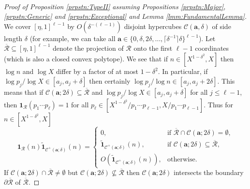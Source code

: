 \documentclass[10pt]{amsart}
\theoremstyle{plain}
\numberwithin{sblmm}{thrm}
\numberwithin{equation}{section}
\begin{document}
\begin{proof}[Proof of Proposition \ref{prpstn:TypeII} assuming Propositions \ref{prpstn:Major}, \ref{prpstn:Generic} and \ref{prpstn:Exceptional} and  Lemma \ref{lmm:FundamentalLemma}]
We cover $[\eta,1]^{\ell-1}$ by $O(\delta^{-(\ell-1)})$ disjoint hypercubes $\mathcal{C}(\mathbf{a},\delta)$ of side length $\delta$ (for example, we can take all $\mathbf{a}\in \{0,\delta,2\delta,\dots,\lceil \delta^{-1}\rceil\delta\}^{\ell-1}$). Let $\overline{\mathcal{R}}\subseteq[\eta,1]^{\ell-1}$ denote the projection of $\mathcal{R}$ onto the first $\ell-1$ coordinates (which is also a closed convex polytope). We see that if $n\in [X^{1-\delta^2},X]$ then $\log{n}$ and $\log{X}$ differ by a factor of at most $1-\delta^2$. In particular, if $\log{p_j}/\log{X}\in [a_j,a_j+\delta]$ then certainly $\log{p_j}/\log{n}\in [a_j,a_j+2\delta]$. This means that if $\mathcal{C}(\mathbf{a};2\delta)\subseteq\overline{\mathcal{R}}$ and $\log{p_j}/\log{X}\in [a_j,a_j+\delta]$ for all $j\le\ell-1$, then $\mathbf{1}_{\mathcal{R}}(p_1\cdots p_\ell)=1$ for all $p_\ell\in[X^{1-\delta^2}/p_1\cdots p_{\ell-1},X/p_1\cdots p_{\ell-1}]$. Thus for $n\in [X^{1-\delta^2},X]$
\begin{equation}
\mathbf{1}_{\mathcal{R}}(n)\tilde{\mathbf{1}}_{\mathcal{C}^+(\mathbf{a};\delta)}(n)=\begin{cases}
0,\qquad &\text{if $\overline{\mathcal{R}}\cap\mathcal{C}(\mathbf{a};2\delta)=\emptyset$},\\
\tilde{\mathbf{1}}_{\mathcal{C}^+(\mathbf{a};\delta)}(n),& \text{if $\mathcal{C}(\mathbf{a};2\delta)\subseteq\overline{\mathcal{R}}$},\\
O(\tilde{\mathbf{1}}_{\mathcal{C}^+(\mathbf{a};\delta)}(n)),&\text{otherwise}.
\end{cases}
\label{eq:RCubeSplit}
\end{equation}
If $\mathcal{C}(\mathbf{a};2\delta)\cap\overline{\mathcal{R}}\ne\emptyset$ but $\mathcal{C}(\mathbf{a};2\delta)\not\subseteq\overline{\mathcal{R}}$ then $\mathcal{C}(\mathbf{a};2\delta)$ intersects the boundary $\partial\overline{\mathcal{R}}$ of $\overline{\mathcal{R}}$. 


\end{proof}
\end{document}
